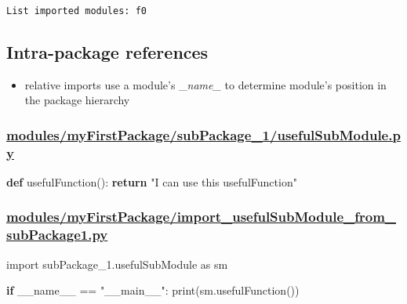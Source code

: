 \documentclass[11pt]{article}
\providecommand{\tightlist}{%
      \setlength{\itemsep}{0pt}\setlength{\parskip}{0pt}}
\newenvironment{Shaded}{}{}
\newcommand{\KeywordTok}[1]{\textcolor[rgb]{0.00,0.44,0.13}{\textbf{{#1}}}}
\newcommand{\StringTok}[1]{\textcolor[rgb]{0.25,0.44,0.63}{{#1}}}
\newcommand{\NormalTok}[1]{{#1}}
\newcommand{\ImportTok}[1]{{#1}}
\newcommand{\VariableTok}[1]{\textcolor[rgb]{0.10,0.09,0.49}{{#1}}}
\newcommand{\ControlFlowTok}[1]{\textcolor[rgb]{0.00,0.44,0.13}{\textbf{{#1}}}}
\newcommand{\OperatorTok}[1]{\textcolor[rgb]{0.40,0.40,0.40}{{#1}}}
\newcommand{\BuiltInTok}[1]{{#1}}
\begin{document}
    \begin{Verbatim}[commandchars=\\\{\}]

List imported modules: f0
    \end{Verbatim}

    \hypertarget{intra-package-references}{%
\subsection{Intra-package references}\label{intra-package-references}}

\begin{itemize}
\tightlist
\item
  relative imports use a module's \_\emph{name\_} to determine module's
  position in the package hierarchy
\end{itemize}

\hypertarget{modulesmyfirstpackagesubpackage_1usefulsubmodule.py}{%
\subsubsection{\texorpdfstring{\url{modules/myFirstPackage/subPackage_1/usefulSubModule.py}}{modules/myFirstPackage/subPackage\_1/usefulSubModule.py}}\label{modulesmyfirstpackagesubpackage_1usefulsubmodule.py}}

\begin{Shaded}
\begin{Highlighting}[]
\KeywordTok{def}\NormalTok{ usefulFunction():}
    \ControlFlowTok{return} \StringTok{"I can use this usefulFunction"}
\end{Highlighting}
\end{Shaded}

\hypertarget{modulesmyfirstpackageimport_usefulsubmodule_from_subpackage1.py}{%
\subsubsection{\texorpdfstring{\url{modules/myFirstPackage/import_usefulSubModule_from_subPackage1.py}}{modules/myFirstPackage/import\_usefulSubModule\_from\_subPackage1.py}}\label{modulesmyfirstpackageimport_usefulsubmodule_from_subpackage1.py}}

\begin{Shaded}
\begin{Highlighting}[]
\ImportTok{import}\NormalTok{ subPackage\_1.usefulSubModule }\ImportTok{as}\NormalTok{ sm}

\ControlFlowTok{if} \VariableTok{\_\_name\_\_} \OperatorTok{==} \StringTok{"\_\_main\_\_"}\NormalTok{: }
    \BuiltInTok{print}\NormalTok{(sm.usefulFunction())}
\end{Highlighting}
\end{Shaded}
\end{document}
